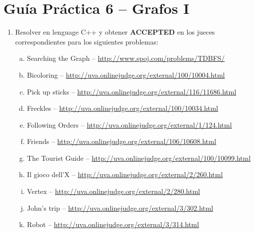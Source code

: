 




\section*{Gu\'ia Pr\'actica 6 -- Grafos I}

\begin{enumerate}[1 -]
	
	\item Resolver en lenguage C++ y obtener \textbf{ACCEPTED} en los jueces correspondientes para los siguientes problemas:
	
	\begin{enumerate}[a)]	
		\item  Searching the Graph -- \href{http://www.spoj.com/problems/TDBFS/}{http://www.spoj.com/problems/TDBFS/}
		\item  Bicoloring -- \href{http://uva.onlinejudge.org/external/100/10004.html}{http://uva.onlinejudge.org/external/100/10004.html}
		\item  Pick up sticks -- \href{http://uva.onlinejudge.org/external/116/11686.html}{http://uva.onlinejudge.org/external/116/11686.html}
		\item Freckles -- \href{http://uva.onlinejudge.org/external/100/10034.html}{http://uva.onlinejudge.org/external/100/10034.html}
		\item  Following Orders -- \href{http://uva.onlinejudge.org/external/1/124.html}{http://uva.onlinejudge.org/external/1/124.html}
		\item Friends -- \href{http://uva.onlinejudge.org/external/106/10608.html}{http://uva.onlinejudge.org/external/106/10608.html}
		\item  The Tourist Guide -- \href{http://uva.onlinejudge.org/external/100/10099.html}{http://uva.onlinejudge.org/external/100/10099.html}
		\item Il gioco dell’X -- \href{http://uva.onlinejudge.org/external/2/260.html}{http://uva.onlinejudge.org/external/2/260.html}
		\item Vertex -- \href{http://uva.onlinejudge.org/external/2/280.html}{http://uva.onlinejudge.org/external/2/280.html}
		\item John’s trip -- \href{http://uva.onlinejudge.org/external/3/302.html}{http://uva.onlinejudge.org/external/3/302.html}
		\item Robot -- \href{http://uva.onlinejudge.org/external/3/314.html}{http://uva.onlinejudge.org/external/3/314.html}
	\end{enumerate}
\end{enumerate}

